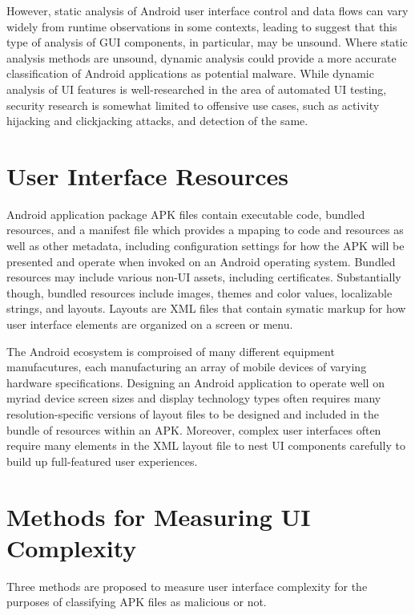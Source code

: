 \documentclass[preprint,1p]{elsarticle}
\begin{document}
However, static analysis of Android user interface control and data flows can vary widely from runtime observations in some contexts, leading \citet{10.1145/2931021.2931026} to suggest that this type of analysis of GUI components, in particular, may be unsound.  Where static analysis methods are unsound, dynamic analysis could provide a more accurate classification of Android applications as potential malware.  While dynamic analysis of UI features is well-researched in the area of automated UI testing, security research is somewhat limited to offensive use cases, such as activity hijacking and clickjacking attacks, and detection of the same.\cite{10.1109/PST.2017.00037}





\section{User Interface Resources}
Android application package APK files contain executable code, bundled resources, and a manifest file which provides a mpaping to code and resources as well as other metadata, including configuration settings for how the APK will be presented and
operate when invoked on an Android operating system.  Bundled resources may include various non-UI assets, including certificates.  Substantially though, bundled resources include images, themes and color values, localizable strings, and
layouts.  Layouts are XML files that contain symatic markup for how user interface elements are organized on a screen or menu.

The Android ecosystem is comproised of many different equipment manufacutures, each manufacturing an array of mobile devices of varying hardware specifications. Designing an Android application to operate well on myriad device screen sizes and display technology types often requires many resolution-specific versions of layout files to be designed and included in the bundle of resources within an APK. Moreover, complex user interfaces often require many elements in the XML layout file to nest UI components carefully to build up full-featured user experiences.

\section{Methods for Measuring UI Complexity}
Three methods are proposed to measure user interface complexity for the purposes of classifying APK files as malicious or not.  
\end{document}
